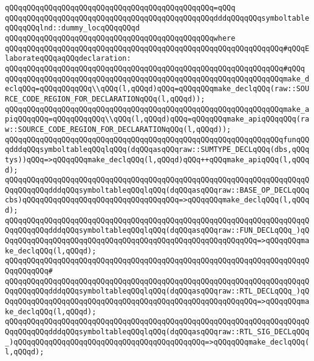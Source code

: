 \verb|qQQqqQQqqQQqqQQqqQQqqQQqqQQqqQQqqQQqqQQqqQQqqQQq=qQQq|\newline
\verb|qQQqqQQqqQQqqQQqqQQqqQQqqQQqqQQqqQQqqQQqqQQqqQQqdddqQQqqQQqsymboltableqQQqqQQqlnd::dummy_locqQQqqQQqd|\newline
\verb|qQQqqQQqqQQqqQQqqQQqqQQqqQQqqQQqqQQqqQQqqQQqqQQqwhere|\newline
\verb|qQQqqQQqqQQqqQQqqQQqqQQqqQQqqQQqqQQqqQQqqQQqqQQqqQQqqQQqqQQqqQQq#qQQqElaborateqQQqaqQQqdeclaration:|\newline
\verb|qQQqqQQqqQQqqQQqqQQqqQQqqQQqqQQqqQQqqQQqqQQqqQQqqQQqqQQqqQQqqQQq#qQQq|\newline
\verb|qQQqqQQqqQQqqQQqqQQqqQQqqQQqqQQqqQQqqQQqqQQqqQQqqQQqqQQqqQQqqQQqmake_declqQQq=qQQqqQQqqQQq\\qQQq(l,qQQqd)qQQq=qQQqqQQqmake_declqQQq(raw::SOURCE_CODE_REGION_FOR_DECLARATIONqQQq(l,qQQqd));|\newline
\verb|qQQqqQQqqQQqqQQqqQQqqQQqqQQqqQQqqQQqqQQqqQQqqQQqqQQqqQQqqQQqqQQqmake_apiqQQqqQQq=qQQqqQQqqQQq\\qQQq(l,qQQqd)qQQq=qQQqqQQqmake_apiqQQqqQQq(raw::SOURCE_CODE_REGION_FOR_DECLARATIONqQQq(l,qQQqd));|\newline
\newline
\verb|qQQqqQQqqQQqqQQqqQQqqQQqqQQqqQQqqQQqqQQqqQQqqQQqqQQqqQQqqQQqqQQqfunqQQqdddqQQqsymboltableqQQqlqQQq(dqQQqasqQQqraw::SUMTYPE_DECLqQQq(dbs,qQQqtys))qQQq=>qQQqqQQqmake_declqQQq(l,qQQqd)qQQq++qQQqmake_apiqQQq(l,qQQqd);|\newline
\verb|qQQqqQQqqQQqqQQqqQQqqQQqqQQqqQQqqQQqqQQqqQQqqQQqqQQqqQQqqQQqqQQqqQQqqQQqqQQqqQQqdddqQQqsymboltableqQQqlqQQq(dqQQqasqQQqraw::BASE_OP_DECLqQQqcbs)qQQqqQQqqQQqqQQqqQQqqQQqqQQqqQQqqQQq=>qQQqqQQqmake_declqQQq(l,qQQqd);|\newline
\verb|qQQqqQQqqQQqqQQqqQQqqQQqqQQqqQQqqQQqqQQqqQQqqQQqqQQqqQQqqQQqqQQqqQQqqQQqqQQqqQQqdddqQQqsymboltableqQQqlqQQq(dqQQqasqQQqraw::FUN_DECLqQQq_)qQQqqQQqqQQqqQQqqQQqqQQqqQQqqQQqqQQqqQQqqQQqqQQqqQQqqQQqqQQq=>qQQqqQQqmake_declqQQq(l,qQQqd);|\newline
\verb|qQQqqQQqqQQqqQQqqQQqqQQqqQQqqQQqqQQqqQQqqQQqqQQqqQQqqQQqqQQqqQQqqQQqqQQqqQQqqQQq#|\newline
\verb|qQQqqQQqqQQqqQQqqQQqqQQqqQQqqQQqqQQqqQQqqQQqqQQqqQQqqQQqqQQqqQQqqQQqqQQqqQQqqQQqdddqQQqsymboltableqQQqlqQQq(dqQQqasqQQqraw::RTL_DECLqQQq_)qQQqqQQqqQQqqQQqqQQqqQQqqQQqqQQqqQQqqQQqqQQqqQQqqQQqqQQqqQQq=>qQQqqQQqmake_declqQQq(l,qQQqd);|\newline
\verb|qQQqqQQqqQQqqQQqqQQqqQQqqQQqqQQqqQQqqQQqqQQqqQQqqQQqqQQqqQQqqQQqqQQqqQQqqQQqqQQqdddqQQqsymboltableqQQqlqQQq(dqQQqasqQQqraw::RTL_SIG_DECLqQQq_)qQQqqQQqqQQqqQQqqQQqqQQqqQQqqQQqqQQqqQQqqQQq=>qQQqqQQqmake_declqQQq(l,qQQqd);|\newline
